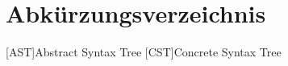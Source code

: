 \chapter*{Abkürzungsverzeichnis}


\begin{acronym}
    [AST]{Abstract Syntax Tree}
    [CST]{Concrete Syntax Tree}
\end{acronym}
